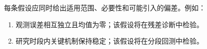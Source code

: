 每条假设应同时给出适用范围、必要性和可能引入的偏差。例如：
\begin{enumerate}
  \item 观测误差相互独立且均值为零；该假设将在残差诊断中检验。
  \item 研究时段内关键机制保持稳定；该假设将在分段回测中检验。
\end{enumerate}
